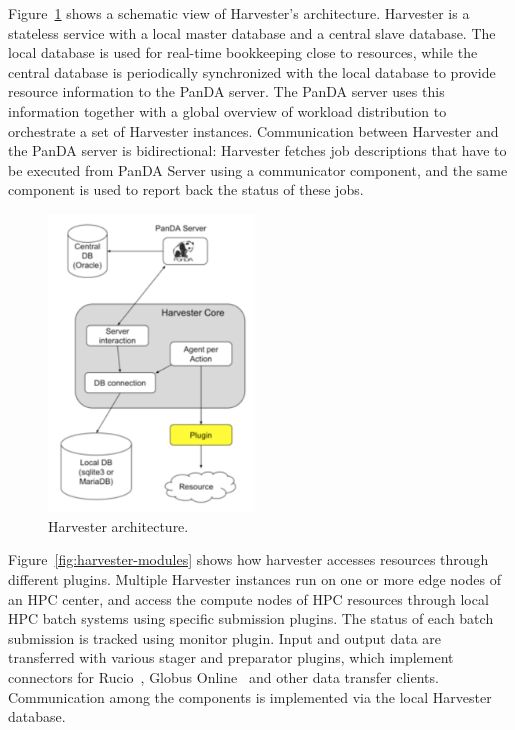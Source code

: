 \documentclass{webofc}
\begin{document}
Figure~\ref{fig:harvester-architecture} shows a schematic view of Harvester's
architecture. Harvester is a stateless service with a local master database
and a central slave database. The local database is used for real-time
bookkeeping close to resources, while the central database is periodically
synchronized with the local database to provide resource information to the
PanDA server. The PanDA server uses this information together with a global
overview of workload distribution to orchestrate a set of Harvester
instances. Communication between Harvester and the PanDA server is
bidirectional: Harvester fetches job descriptions that have to be executed
from PanDA Server using a communicator component, and the same component is
used to report back the status of these jobs.


\begin{figure}
  \centering
  \includegraphics[width=0.49\textwidth]{figures/panda-harvester-overview.pdf}
  \caption{Harvester architecture.}
  \label{fig:harvester-architecture}
\end{figure}

Figure~\ref{fig:harvester-modules} shows how harvester accesses resources
through different plugins. Multiple Harvester instances run on one or more
edge nodes of an HPC center, and access the compute nodes of HPC resources
through local HPC batch systems using specific submission plugins. The status
of each batch submission is tracked using monitor plugin. Input and output
data are transferred with various stager and preparator plugins, which
implement connectors for Rucio~\cite{garonne2014rucio}, Globus
Online~\cite{foster2011globus} and other data transfer clients. Communication
among the components is implemented via the local Harvester database.
\end{document}
